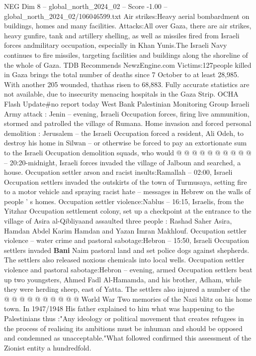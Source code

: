 \begin{textsample}{NEG Dim 8 – global\_north\_2024\_02 – Score -1.00 – global\_north\_2024\_02/106046599.txt}  \label{ex:f8_neg_429}
Air strikes:Heavy aerial bombardment on buildings, homes and many facilities.
Attacks:All over Gaza, there are air strikes, heavy gunfire, tank and artillery shelling, as well as missiles fired from Israeli forces andmilitary occupation, especially in Khan Yunis.The Israeli Navy continues to fire missiles, targeting facilities and buildings along the shoreline of the whole of Gaza.
TDB Recommends NewzEngine.com Victims:127people killed in Gaza brings the total number of deaths since 7 October to at least 28,985.
With another 205 wounded, thathas risen to 68,883.
Fully accurate statistics are not available, due to insecurity menacing hospitals in the Gaza Strip.
OCHA Flash Update\#no report today West Bank Palestinian Monitoring Group Israeli Army attack : Jenin -- evening, Israeli Occupation forces, firing live ammunition, stormed and patrolled the village of Rumana.
Home invasion and forced personal demolition : Jerusalem -- the Israeli Occupation forced a resident, Ali Odeh, to destroy his home in Silwan -- or otherwise be forced to pay an extortionate sum to the Israeli Occupation demolition squads, who would @ @ @ @ @ @ @ @ @ @ -- 20:20-midnight, Israeli forces invaded the village of Jalboun and searched, a house.
Occupation settler arson and racist insults:Ramallah -- 02:00, Israeli Occupation settlers invaded the outskirts of the town of Turmusaya, setting fire to a motor vehicle and spraying racist hate -- messages in Hebrew on the walls of people ' s homes.
Occupation settler violence:Nablus -- 16:15, Israelis, from the Yitzhar Occupation settlement colony, set up a checkpoint at the entrance to the village of Asira al-Qibliyaand assaulted three people : Rashad Saher Asira, Hamdan Abdel Karim Hamdan and Yazan Imran Makhlouf.
Occupation settler violence -- water crime and pastoral sabotage:Hebron -- 15:50, Israeli Occupation settlers invaded \textbf{Bani} Naim pastoral land and set police dogs against shepherds.
The settlers also released noxious chemicals into local wells.
Occupation settler violence and pastoral sabotage:Hebron -- evening, armed Occupation settlers beat up two youngsters, Ahmed Fadl Al-Hamamda, and his brother, Adham, while they were herding sheep, east of Yatta.
The settlers also injured a number of the @ @ @ @ @ @ @ @ @ @ World War Two memories of the Nazi blitz on his home town.
In 1947/1948 His father explained to him what was happening to the Palestinians thus :"Any ideology or political movement that creates refugees in the process of realising its ambitions must be inhuman and should be opposed and condemned as unacceptable."What followed confirmed this assessment of the Zionist entity a hundredfold.

\end{textsample}
